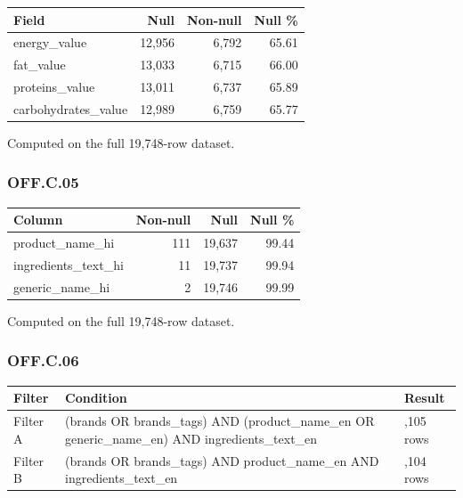 \documentclass[
  letterpaper,
  DIV=11,
  numbers=noendperiod]{scrartcl}
\newcounter{none} %
\begin{document}
{\def\LTcaptype{none} %
\begin{longtable}[]{@{}lrrr@{}}
\toprule\noalign{}
Field & Null & Non-null & Null \% \\
\midrule\noalign{}
\endhead
\bottomrule\noalign{}
\endlastfoot
energy\_value & 12,956 & 6,792 & 65.61 \\
fat\_value & 13,033 & 6,715 & 66.00 \\
proteins\_value & 13,011 & 6,737 & 65.89 \\
carbohydrates\_value & 12,989 & 6,759 & 65.77 \\
\end{longtable}
}

Computed on the full 19,748-row dataset.

\subsubsection{OFF.C.05}\label{off.c.05}

{\def\LTcaptype{none} %
\begin{longtable}[]{@{}lrrr@{}}
\toprule\noalign{}
Column & Non-null & Null & Null \% \\
\midrule\noalign{}
\endhead
\bottomrule\noalign{}
\endlastfoot
product\_name\_hi & 111 & 19,637 & 99.44 \\
ingredients\_text\_hi & 11 & 19,737 & 99.94 \\
generic\_name\_hi & 2 & 19,746 & 99.99 \\
\end{longtable}
}

Computed on the full 19,748-row dataset.

\subsubsection{OFF.C.06}\label{off.c.06}

{\def\LTcaptype{none} %
\begin{longtable}[]{@{}
  >{\raggedright\arraybackslash}p{}
  >{\raggedright\arraybackslash}p{}
  >{\raggedleft\arraybackslash}p{}@{}}
\toprule\noalign{}
\begin{minipage}[b]{\linewidth}\raggedright
Filter
\end{minipage} & \begin{minipage}[b]{\linewidth}\raggedright
Condition
\end{minipage} & \begin{minipage}[b]{\linewidth}\raggedleft
Result
\end{minipage} \\
\midrule\noalign{}
\endhead
\bottomrule\noalign{}
\endlastfoot
Filter A & (brands OR brands\_tags) AND (product\_name\_en OR
generic\_name\_en) AND ingredients\_text\_en & 4,105 rows \\
Filter B & (brands OR brands\_tags) AND product\_name\_en AND
ingredients\_text\_en & 4,104 rows \\
\end{longtable}
}
\end{document}
